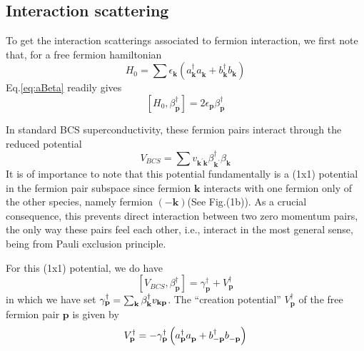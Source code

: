 \documentclass[aps,prb,superscriptaddress,showpacs,reprint,lengthcheck]{revtex4-1}
\newcommand{\vk}{\ensuremath{\mathbf{k}}}
\newcommand{\vp}{\ensuremath{\mathbf{p}}}
\begin{document}
\subsection{Interaction scattering}

To get the interaction scatterings associated to fermion interaction, we
first note that, for a free fermion hamiltonian 
\begin{equation}  \label{eq:h0}
H_0=\sum{\epsilon_\vk\left(a^{\dagger}_{\mathbf{k} } a^{}_{\mathbf{k}
}+b^{\dagger}_{\mathbf{k} } b^{}_{\mathbf{k} }\right) }
\end{equation}
Eq.\eqref{eq:aBeta} readily gives 
\begin{equation}  \label{eq:betaH}
\left[H_0,\beta^{\dagger}_\vp\right]  =2\epsilon_\vp\beta^{\dagger}_\vp
\end{equation}

In  standard BCS superconductivity, these fermion pairs interact through the reduced potential
\begin{equation}  \label{eq:vbcs}
V_{BCS}=\sum{v_{\mathbf{k} ^{\prime}\mathbf{k} }\beta^{\dagger}_{\mathbf{k}
^{\prime}}\beta^{}_{\mathbf{k} }}
\end{equation}
It is of importance to note that this potential fundamentally is a (1x1) potential in the fermion pair subspace since fermion $\mathbf{k}$ 
interacts with one fermion only of the other
species, namely fermion $\left(-\mathbf{k} \right)$(See Fig.(1b)). As a crucial consequence, this prevents direct interaction between two zero momentum pairs, the only way these pairs feel each other, i.e., interact in the most general sense, being from Pauli exclusion principle. 


  For this (1x1)
potential, we do have 
\begin{equation}  \label{eq:vbeta}
\left[V_{BCS},\beta^{\dagger}_\vp\right] 
=\gamma^{\dagger}_\vp+V^{\dagger}_\vp
\end{equation}
in which we have set $\gamma^{\dagger}_\vp=\sum_\vk\beta^{\dagger}_\vk{}v_{%
\mathbf{k} \mathbf{p} }$. The ``creation potential'' $V^{\dagger}_\vp$ of the free fermion pair 
$\mathbf{p} $ is given by 
\begin{equation}  \label{eq:betaV}
V^{\dagger}_\vp=-{\gamma^{\dagger}_\vp}\left(a^{\dagger}_{\mathbf{p} }a^{}_{%
\mathbf{p} }+b^{\dagger}_{-\mathbf{p} }b^{}_{-\mathbf{p} }\right) 
\end{equation}
\end{document}
